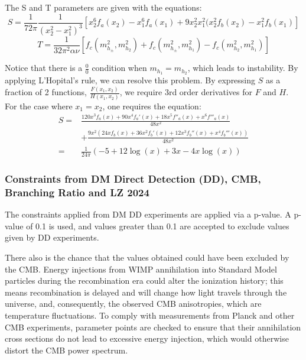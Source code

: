 \documentclass[12pt]{article}
\begin{document}
The S and T parameters are given \cite{Belyaev:2016lok} with the equations:
\begin{equation}
           S = \frac{1}{72\pi}\frac{1}{(x^2_2 - x^2_1)^3}[x^6_2f_a(x_2)-x^6_1f_a(x_1)+ 9x_2^2x_1^2(x_2^2f_b(x_2)-x^2_1f_b(x_1)] 
    \label{eqn:S}
\end{equation}
\begin{equation}
        T = \frac{1}{32\pi^2\alpha\nu}[f_c(m^2_{h_\pm},m^2_{h_2})
            + f_c(m^2_{h_\pm},m^2_{h_1}) - f_c(m^2_{h_2},m^2_{h_1})]
    \label{eqn:T}
\end{equation}

Notice that there is a $\frac{0}{0}$ condition when $m_{h_1} = m_{h_2}$, which leads to instability. By applying L'Hopital's rule, we can resolve this problem. By expressing $S$ as a fraction of 2 functions, $\frac{F(x_1, x_2)}{H(x_1, x_2)}$, we require 3rd order derivatives for $F$  and $H$. For the case where $x_1 = x_2$, one requires the equation: 
\begin{equation}
    \begin{split}
        S =& \frac{120 x^3f_a(x) + 90 x^4f_a'(x)+18x^5f''_a(x)+x^6f'''_a(x)}{48x^2} \\&+\frac{9x^2\left(24xf_b(x) + 36x^2f_b'(x)+12x^3f_b''(x) + x^4f_b'''(x)\right)}{48x^2}
        \\ =& \frac{1}{24\pi}\left(-5 + 12\log(x) + 3x - 4x\log(x)\right)
    \end{split}
\end{equation}

\subsubsection{Constraints from DM Direct Detection (DD), CMB, Branching Ratio and LZ 2024}
The constraints applied from DM DD experiments are applied via a p-value. A p-value of 0.1 is used, and values greater than 0.1 are accepted to exclude values given by DD experiments.

There also is the chance that the values obtained could have been excluded by the CMB. Energy injections from WIMP annihilation into Standard Model particles during the recombination era could alter the ionization history; this means recombination is delayed and will change how light travels through the universe, and, consequently, the observed CMB anisotropies, which are temperature fluctuations. To comply with measurements from Planck and other CMB experiments, parameter points are checked to ensure that their annihilation cross sections do not lead to excessive energy injection, which would otherwise distort the CMB power spectrum. 
\end{document}
